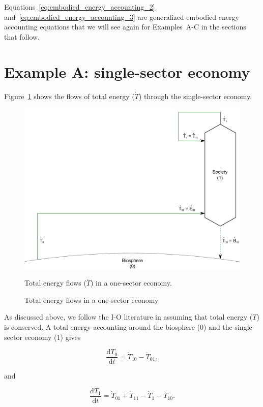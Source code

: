 Equations~\ref{eq:embodied_energy_accounting_2}
and~\ref{eq:embodied_energy_accounting_3} 
are generalized embodied energy accounting equations that we will
see again for Examples~A-C in the sections that follow.


\section{Example A: single-sector economy} %

Figure~\ref{fig:A_total_energy_T_dot} shows the flows 
of total energy ($\dot{T}$) through the single-sector economy.

\begin{figure}[!ht]
\includegraphics[width=1.0\linewidth]{Part_1/Chapter_Embodied/images/1_sector_embodied_energy.pdf}
\caption{Total energy flows in a one-sector economy}{Total energy flows ($\dot{T}$) in a one-sector economy.}
\label{fig:A_total_energy_T_dot}
\end{figure}

As discussed above, we follow the I-O literature in assuming that 
total energy ($T$) is conserved. 
A total energy accounting around the biosphere (0)
and the single-sector economy (1) gives

\begin{equation} \label{eq:A_T_acct_0}
	\frac{\mathrm{d}T_{0}}{\mathrm{d}t} 
	= \dot{T}_{10} 
	- \dot{T}_{01},
\end{equation}

\noindent and

\begin{equation} \label{eq:A_T_acct_1}
	\frac{\mathrm{d}T_{1}}{\mathrm{d}t} 
	= \dot{T}_{01} 
	+ \dot{T}_{11}
	- \dot{T}_{1}
	- \dot{T}_{10}.
\end{equation}

